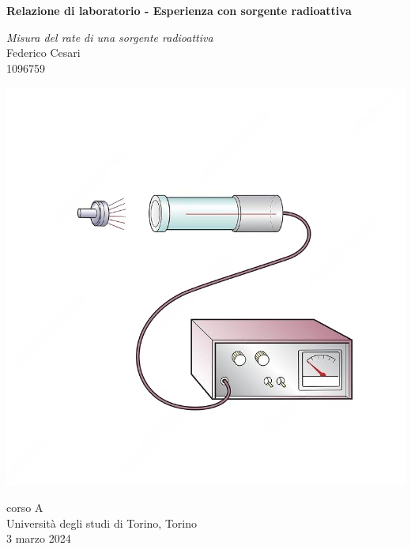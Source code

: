 \begin{titlepage}
   \begin{center}
       \vspace*{1cm}
        
       \textbf{\LARGE Relazione di laboratorio - Esperienza con sorgente radioattiva}
       
       \vspace{0.3cm}
       \large \textit{Misura del rate di una sorgente radioattiva} \\
       
       \vspace{0.5cm}
       \Large Federico Cesari \\
       
       \small 1096759

			
		\vspace{1cm}
		\begin{center}
			\includegraphics[scale=1.2]{geiger.jpeg}	
		\end{center}
		
		

       \vfill
            
       
            
       \vspace{0.8cm}
     
       
            
       corso A\\
       Università degli studi di Torino, Torino\\
       3 marzo 2024\\
       
            
   \end{center}
\end{titlepage}
